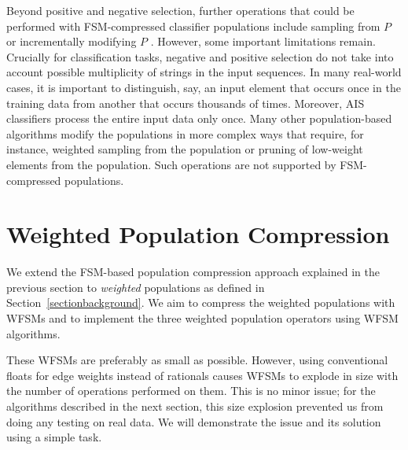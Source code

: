 \documentclass{llncs}
\begin{document}
Beyond positive and negative selection, further operations that could be performed with FSM-compressed classifier populations include sampling from $P$ or incrementally modifying $P$ \cite{Textor2014}. However, some important limitations remain. Crucially for classification tasks, negative and positive selection do not take into account possible multiplicity of strings in the input sequences. In many real-world cases, it is important to distinguish, say, an input element that occurs once in the training data from another that occurs thousands of times. Moreover, AIS classifiers process the entire input data only once. Many other population-based algorithms modify the populations in more complex ways that require, for instance, weighted sampling from the population or pruning of low-weight elements from the population. Such operations are not supported by FSM-compressed populations.

\section{Weighted Population Compression}
\label{sectionfsms}\label{sectionwhyrationals}

We extend the FSM-based population compression approach explained in
the previous section to \emph{weighted} populations as defined in
Section~\ref{sectionbackground}.
We aim to compress the weighted populations with WFSMs and to
implement the three weighted population operators using WFSM
algorithms.

These WFSMs are preferably as small as possible.
However, using conventional floats for edge weights instead of
rationals causes WFSMs to explode in size with the number of
operations performed on them.
This is no minor issue;
for the algorithms described in the next section,
this size explosion prevented us from doing any testing on
real data. We will demonstrate the issue and its solution
using a simple task.
\end{document}
